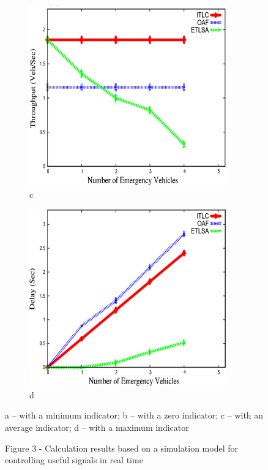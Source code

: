 \begin{figure}[H]
    \centering
    \begin{subfigure}[b]{0.45\textwidth}
        \centering
        \includegraphics[width=\textwidth]{assets/76}
		\caption*{c}
    \end{subfigure}
    \hfill
    \begin{subfigure}[b]{0.45\textwidth}
        \centering
        \includegraphics[width=\textwidth]{assets/76.1}
		\caption*{d}
    \end{subfigure}
	\caption*{a -- with a minimum indicator; b -- with a zero indicator; c -- with an average indicator; d -- with a maximum indicator}
	\caption*{Figure 3 - Calculation results based on a simulation model for controlling useful signals in real time}
\end{figure}

